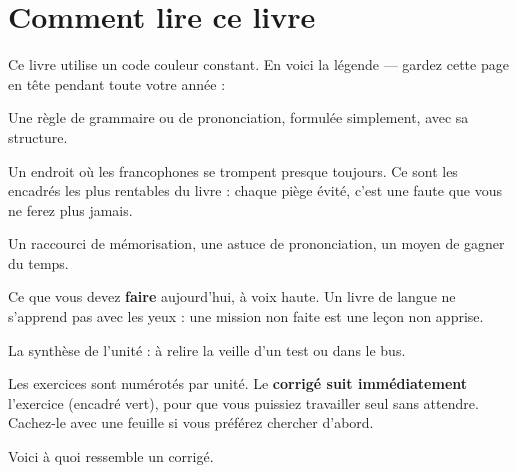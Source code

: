\section*{Comment lire ce livre}
Ce livre utilise un code couleur constant. En voici la légende --- gardez cette page en tête
pendant toute votre année :

\begin{regle}
Une règle de grammaire ou de prononciation, formulée simplement, avec sa structure.
\end{regle}

\begin{piege}
Un endroit où les francophones se trompent presque toujours. Ce sont les encadrés les plus
rentables du livre : chaque piège évité, c'est une faute que vous ne ferez plus jamais.
\end{piege}

\begin{astuce}
Un raccourci de mémorisation, une astuce de prononciation, un moyen de gagner du temps.
\end{astuce}

\begin{mission}
Ce que vous devez \textbf{faire} aujourd'hui, à voix haute. Un livre de langue ne s'apprend
pas avec les yeux : une mission non faite est une leçon non apprise.
\end{mission}

\begin{memo}
La synthèse de l'unité : à relire la veille d'un test ou dans le bus.
\end{memo}

\begin{exo}[X --- modèle]
Les exercices sont numérotés par unité. Le \textbf{corrigé suit immédiatement} l'exercice
(encadré vert), pour que vous puissiez travailler seul sans attendre. Cachez-le avec une
feuille si vous préférez chercher d'abord.
\end{exo}

\begin{corrige}
Voici à quoi ressemble un corrigé.
\end{corrige}

